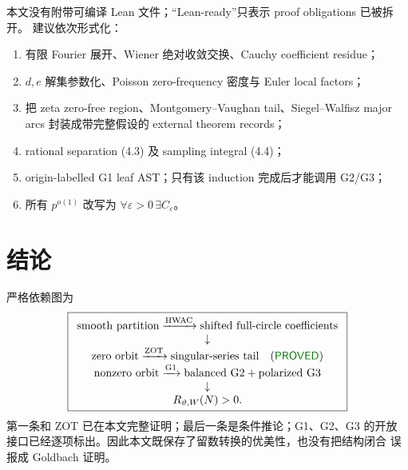 \documentclass[11pt,a4paper]{ctexart}
\theoremstyle{definition}
\newcommand{\1}{\mathbf 1}
\newcommand{\PROVED}{\textcolor{green!45!black}{\textsf{PROVED}}}
\begin{document}
本文没有附带可编译 Lean 文件；“Lean-ready”只表示 proof obligations 已被拆开。
建议依次形式化：
\begin{enumerate}
\item 有限 Fourier 展开、Wiener 绝对收敛交换、Cauchy coefficient residue；
\item $d,e$ 解集参数化、Poisson zero-frequency 密度与 Euler local factors；
\item 把 zeta zero-free region、Montgomery--Vaughan tail、Siegel--Walfisz
major arcs 封装成带完整假设的 external theorem records；
\item rational separation (4.3) 及 sampling integral (4.4)；
\item origin-labelled G1 leaf AST；只有该 induction 完成后才能调用 G2/G3；
\item 所有 $p^{o(1)}$ 改写为 $\forall\varepsilon>0\,\exists C_\varepsilon$。
\end{enumerate}

\section{结论}

严格依赖图为
\[
\boxed{
\begin{array}{c}
\text{smooth partition}\xrightarrow{\rm HWAC}
\text{shifted full-circle coefficients}\\
\downarrow\\
\text{zero orbit}\xrightarrow{\rm ZOT}
\text{singular-series tail}\quad(\PROVED)\\
\text{nonzero orbit}\xrightarrow{\rm G1}
\text{balanced G2}+\text{polarized G3}\\
\downarrow\\
R_{\vartheta,W}(N)>0.
\end{array}}
\]
第一条和 ZOT 已在本文完整证明；最后一条是条件推论；G1、G2、G3 的开放
接口已经逐项标出。因此本文既保存了留数转换的优美性，也没有把结构闭合
误报成 Goldbach 证明。
\end{document}
